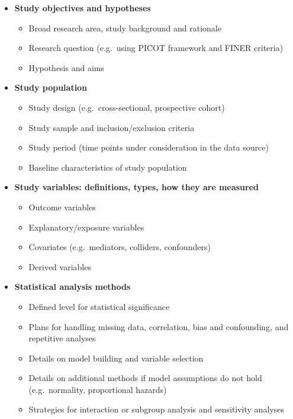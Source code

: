 \documentclass[
]{book}
\providecommand{\tightlist}{%
  \setlength{\itemsep}{0pt}\setlength{\parskip}{0pt}}
\begin{document}
\begin{itemize}
\item
  \textbf{Study objectives and hypotheses}

  \begin{itemize}
  \tightlist
  \item
    Broad research area, study background and rationale
  \item
    Research question (e.g.~using PICOT framework and FINER criteria)
  \item
    Hypothesis and aims
  \end{itemize}
\item
  \textbf{Study population}

  \begin{itemize}
  \tightlist
  \item
    Study design (e.g.~cross-sectional, prospective cohort)
  \item
    Study sample and inclusion/exclusion criteria
  \item
    Study period (time points under consideration in the data source)
  \item
    Baseline characteristics of study population
  \end{itemize}
\item
  \textbf{Study variables: definitions, types, how they are measured}

  \begin{itemize}
  \tightlist
  \item
    Outcome variables
  \item
    Explanatory/exposure variables
  \item
    Covariates (e.g.~mediators, colliders, confounders)
  \item
    Derived variables
  \end{itemize}
\item
  \textbf{Statistical analysis methods}

  \begin{itemize}
  \tightlist
  \item
    Defined level for statistical significance
  \item
    Plans for handling missing data, correlation, bias and confounding, and repetitive analyses
  \item
    Details on model building and variable selection
  \item
    Details on additional methods if model assumptions do not hold (e.g.~normality, proportional hazards)
  \item
    Strategies for interaction or subgroup analysis and sensitivity analyses
  \end{itemize}
\end{itemize}
\end{document}
